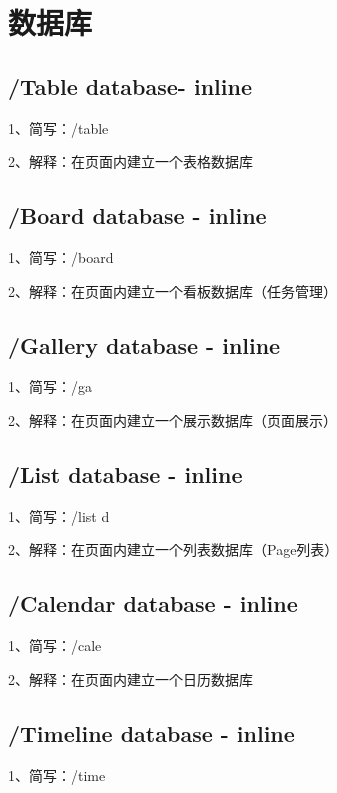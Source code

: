 \chapter{数据库}

\section{/Table database- inline}

1、简写：/table

2、解释：在页面内建立一个表格数据库

\section{/Board database - inline}

1、简写：/board

2、解释：在页面内建立一个看板数据库（任务管理）

\section{/Gallery database - inline}

1、简写：/ga

2、解释：在页面内建立一个展示数据库（页面展示）

\section{/List database - inline}

1、简写：/list d

2、解释：在页面内建立一个列表数据库（Page列表）

\section{/Calendar database - inline}

1、简写：/cale

2、解释：在页面内建立一个日历数据库

\section{/Timeline database - inline}

1、简写：/time


